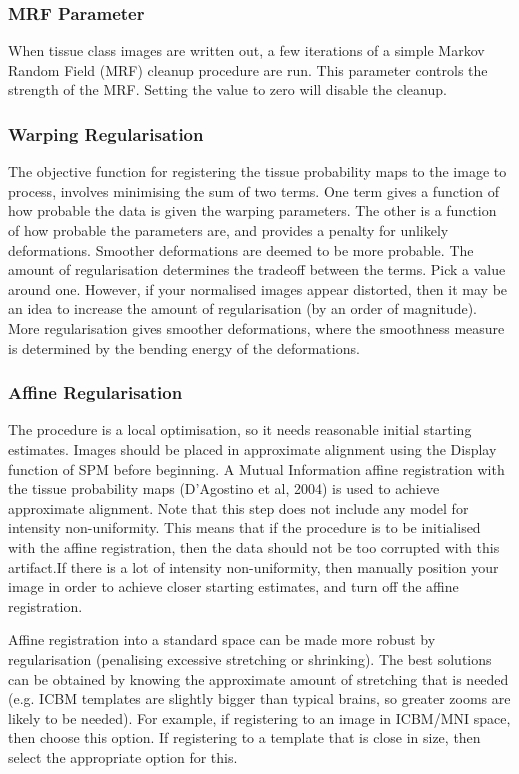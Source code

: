 \subsubsection{MRF Parameter}
When tissue class images are written out, a few iterations of a simple Markov Random Field (MRF) cleanup procedure are run.  This parameter controls the strength of the MRF. Setting the value to zero will disable the cleanup.


\subsubsection{Warping Regularisation}
The objective function for registering the tissue probability maps to the image to process, involves minimising the sum of two terms. One term gives a function of how probable the data is given the warping parameters. The other is a function of how probable the parameters are, and provides a penalty for unlikely deformations. Smoother deformations are deemed to be more probable. The amount of regularisation determines the tradeoff between the terms. Pick a value around one.  However, if your normalised images appear distorted, then it may be an idea to increase the amount of regularisation (by an order of magnitude). More regularisation gives smoother deformations, where the smoothness measure is determined by the bending energy of the deformations. 


\subsubsection{Affine Regularisation}
The procedure is a local optimisation, so it needs reasonable initial starting estimates. Images should be placed in approximate alignment using the Display function of SPM before beginning. A Mutual Information affine registration with the tissue probability maps (D'Agostino et al, 2004) is used to achieve approximate alignment. Note that this step does not include any model for intensity non-uniformity. This means that if the procedure is to be initialised with the affine registration, then the data should not be too corrupted with this artifact.If there is a lot of intensity non-uniformity, then manually position your image in order to achieve closer starting estimates, and turn off the affine registration.



Affine registration into a standard space can be made more robust by regularisation (penalising excessive stretching or shrinking).  The best solutions can be obtained by knowing the approximate amount of stretching that is needed (e.g. ICBM templates are slightly bigger than typical brains, so greater zooms are likely to be needed). For example, if registering to an image in ICBM/MNI space, then choose this option.  If registering to a template that is close in size, then select the appropriate option for this.


